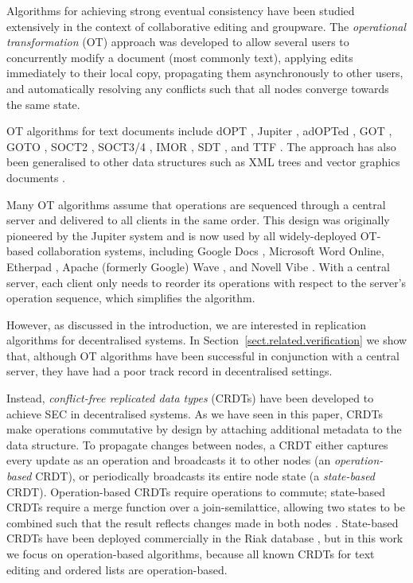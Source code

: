 Algorithms for achieving strong eventual consistency have been studied extensively in the context of collaborative editing and groupware.
The \emph{operational transformation} (OT) approach was developed to allow several users to concurrently modify a document (most commonly text), applying edits immediately to their local copy, propagating them asynchronously to other users, and automatically resolving any conflicts such that all nodes converge towards the same state.

OT algorithms for text documents include dOPT \cite{Ellis:1989ue}, Jupiter \cite{Nichols:1995fd}, adOPTed \cite{Ressel:1996wx}, GOT \cite{Sun:1998un}, GOTO \cite{Sun:1998vf}, SOCT2 \cite{Suleiman:1997gl,Suleiman:1998eu}, SOCT3/4 \cite{Vidot:2000ch}, IMOR \cite{Imine:2003ks}, SDT \cite{Li:2004er,Li:2008hw}, and TTF \cite{Oster:2006tr}.
The approach has also been generalised to other data structures such as XML trees \cite{Ignat:2003jy,Davis:2002iv,Jungnickel:2015ua} and vector graphics documents \cite{Sun:2002jb}.

Many OT algorithms assume that operations are sequenced through a central server and delivered to all clients in the same order.
This design was originally pioneered by the Jupiter system \cite{Nichols:1995fd} and is now used by all widely-deployed OT-based collaboration systems, including Google Docs \cite{DayRichter:2010tt}, Microsoft Word Online, Etherpad \cite{Etherpad:2011um}, Apache (formerly Google) Wave \cite{Wang:2015vo}, and Novell Vibe \cite{Spiewak:2010vw}.
With a central server, each client only needs to reorder its operations with respect to the server's operation sequence, which simplifies the algorithm.

However, as discussed in the introduction, we are interested in replication algorithms for decentralised systems.
In Section~\ref{sect.related.verification} we show that, although OT algorithms have been successful in conjunction with a central server, they have had a poor track record in decentralised settings.

Instead, \emph{conflict-free replicated data types} (CRDTs) have been developed to achieve SEC in decentralised systems.
As we have seen in this paper, CRDTs make operations commutative by design by attaching additional metadata to the data structure.
To propagate changes between nodes, a CRDT either captures every update as an operation and broadcasts it to other nodes (an \emph{operation-based} CRDT), or periodically broadcasts its entire node state (a \emph{state-based} CRDT).
Operation-based CRDTs require operations to commute; state-based CRDTs require a merge function over a join-semilattice, allowing two states to be combined such that the result reflects changes made in both nodes \cite{Shapiro:2011wy,Shapiro:2011un}.
State-based CRDTs have been deployed commercially in the Riak database \cite{Brown:2014hs}, but in this work we focus on operation-based algorithms, because all known CRDTs for text editing and ordered lists are operation-based.

